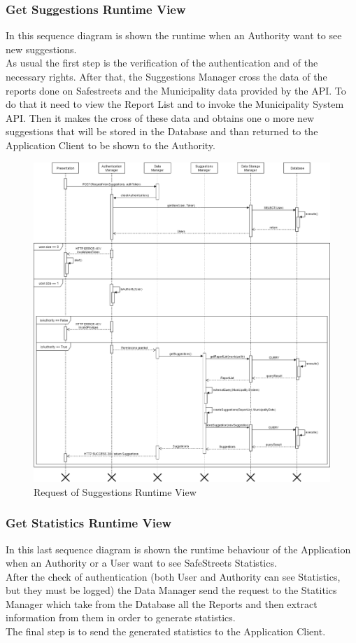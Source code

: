 \subsubsection{Get Suggestions Runtime View}
In this sequence diagram is shown the runtime when an Authority want to see new suggestions.\\
As usual the first step is the verification of the authentication and of the necessary rights. After that, the Suggestions Manager cross the data of the reports done on Safestreets and the Municipality data provided by the API. To do that it need to view the Report List and to invoke the Municipality System API. Then it makes the cross of these data and obtains one o more new suggestions that will be stored in the Database and than returned to the Application Client to be shown to the Authority.
\begin{figure}[H]
          \includegraphics[scale=0.35]{Images/Seq_viewSuggestions.png}
        \caption{Request of Suggestions Runtime View}
\end{figure}

\subsubsection{Get Statistics Runtime View}
In this last sequence diagram is shown the runtime behaviour of the Application when an Authority or a User want to see SafeStreets Statistics.\\
After the check of authentication (both User and Authority can see Statistics, but they must be logged) the Data Manager send the request to the Statitics Manager which take from the Database all the Reports and then extract information from them in order to generate statistics.\\
The final step is to send  the generated statistics to the Application Client.

